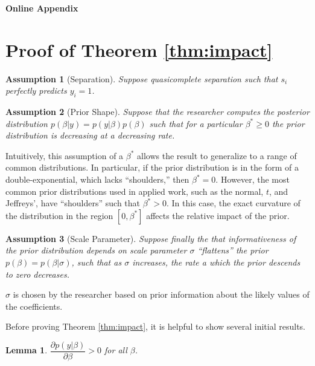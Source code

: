 \documentclass[12pt]{article}
\newtheorem{lemma}{Lemma}
\newtheorem{assumption}{Assumption}
\begin{document}
\clearpage



\clearpage
\begin{appendix}
\begin{center}
\LARGE{\textbf{Online Appendix}}\vspace{4mm}
\end{center}

\section*{Proof of Theorem \ref{thm:impact}}

\begin{assumption}[Separation]
Suppose quasicomplete separation such that $s_i$ perfectly predicts $y_i = 1$. 
\end{assumption}

\begin{assumption}[Prior Shape]
Suppose that the researcher computes the posterior distribution $p(\beta | y) = p(y | \beta)p(\beta)$ such that for a particular $\beta^* \geq 0$ the prior distribution is decreasing at a decreasing rate.
\end{assumption}

Intuitively, this assumption of a $\beta^*$ allows the result to generalize to a range of common distributions. In particular, if the prior distribution is in the form of a double-exponential, which lacks ``shoulders,'' then $\beta^* = 0$. However, the most common prior distributions used in applied work, such as the normal, $t$, and Jeffreys', have ``shoulders'' such that $\beta^* > 0$. In this case, the exact curvature of the distribution in the region $[0, \beta^*]$ affects the relative impact of the prior.

\begin{assumption}[Scale Parameter]
Suppose finally the that informativeness of the prior distribution depends on scale parameter $\sigma$ ``flattens'' the prior $p(\beta) = p(\beta | \sigma)$, such that as $\sigma$ increases, the rate a which the prior descends to zero decreases.
\end{assumption}

$\sigma$ is chosen by the researcher based on prior information about the likely values of the coefficients.

Before proving Theorem \ref{thm:impact}, it is helpful to show several initial results.

\begin{lemma}\label{thm:L1}
$\dfrac{\partial p(y | \beta)}{\partial \beta} > 0$ for all $\beta$. 
\end{lemma}


\end{appendix}
\end{document}
